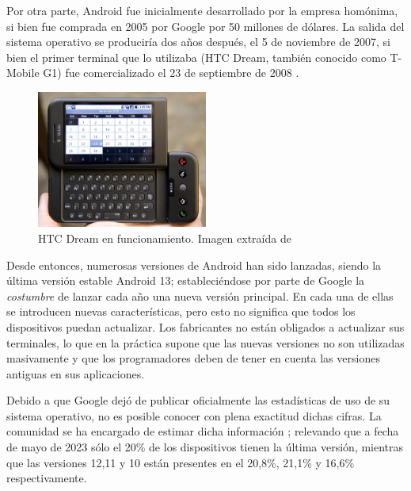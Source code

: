            Por otra parte, Android fue inicialmente desarrollado por la empresa homónima, si bien fue comprada en 2005
            por Google por 50 millones de dólares. La salida del sistema operativo se produciría dos años después, el 5 
            de noviembre de 2007, si bien el primer terminal que lo utilizaba (HTC Dream, también conocido como 
            T-Mobile G1) fue comercializado el 23 de septiembre de 2008 \cite{adeva_android_2023} \cite{marquez_asi_2022}.

            \begin{figure}[h]
                \centering
                \includegraphics[width=0.5\textwidth]{figures/HTC Dream.jpg}
                \caption[HTC Dream en funcionamiento.]{HTC Dream en funcionamiento. Imagen extraída de \cite{oryl_t-mobile_2008}}
                \label{figure:android:htc_dream}
            \end{figure}

            Desde entonces, numerosas versiones de Android han sido lanzadas, siendo la última versión estable Android 
            13; estableciéndose por parte de Google la \textit{costumbre} de lanzar cada año una nueva versión principal. 
            En cada una de ellas se introducen nuevas características, pero esto no significa que todos los dispositivos 
            puedan actualizar. Los fabricantes no están obligados a actualizar sus terminales, lo que en la práctica 
            supone que las nuevas versiones no son utilizadas masivamente y que los programadores deben de tener en 
            cuenta las versiones antiguas en sus aplicaciones. 
            

            Debido a que Google dejó de publicar oficialmente las estadísticas de uso de su sistema operativo, no es
            posible conocer con plena exactitud dichas cifras. La comunidad se ha encargado de estimar dicha 
            información \cite{belinski_android_nodate}; relevando que a fecha de mayo de 2023 sólo el 20\% de los 
            dispositivos tienen la última versión, mientras que las versiones 12,11 y 10 están presentes en el 
            20,8\%, 21,1\% y 16,6\% respectivamente. 

